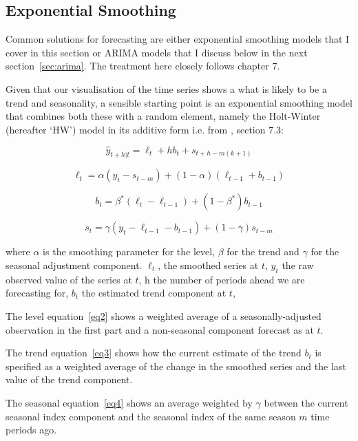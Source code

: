 \documentclass[conference]{IEEEtran}
\begin{document}
\subsection{Exponential Smoothing}
\label{sec:exp}

Common solutions for forecasting are either exponential smoothing models that I cover in this section or ARIMA models that I discuss below in the next section~\ref{sec:arima}.  The treatment here closely follows \cite{fpp2} chapter 7.  

Given that our visualisation of the time series shows a what is likely to be a trend and seasonality, a sensible starting point is an exponential smoothing model that combines both these with a random element, namely the Holt-Winter (hereafter `HW') model in its additive form i.e. from \cite{fpp2}, section 7.3: 

\begin{equation}
\hat{y}_{t+h|t}=\ell_{t} + hb_{t} + s_{t+h-m(k+1)}
\end{equation}

\begin{equation}
\label{eq2}
\ell_{t} = \alpha(y_t - s_{t-m}) + (1-\alpha)(\ell_{t-1} + b_{t-1})
\end{equation}

\begin{equation}
\label{eq3}
b_t = \beta^{*} (\ell_t - \ell_{t-1}) + (1-\beta^{*})b_{t-1}
\end{equation}

\begin{equation}
\label{eq4}
s_t = \gamma(y_t - \ell_{t-1} - b_{t-1}) + (1-\gamma)s_{t-m}
\end{equation}

where $\alpha$ is the smoothing parameter for the level, $\beta$ for the trend and $\gamma$ for the seasonal adjustment component.  $\ell_t$, the smoothed series at $t$, $y_t$ the raw observed value of the series at $t$, h the number of periods ahead we are forecasting for, $b_t$ the estimated trend component at $t$, 

The level equation~\ref{eq2} shows a weighted average of a seasonally-adjusted observation in the first part and a non-seasonal component forecast as at $t$.  

The trend equation~\ref{eq3} shows how the current estimate of the trend $b_t$ is specified as a weighted average of the change in the smoothed series and the last value of the trend component.  

The seasonal equation~\ref{eq4} shows an average weighted by $\gamma$ between the current seasonal index component and the seasonal index of the same season $m$ time periods ago.
\end{document}
